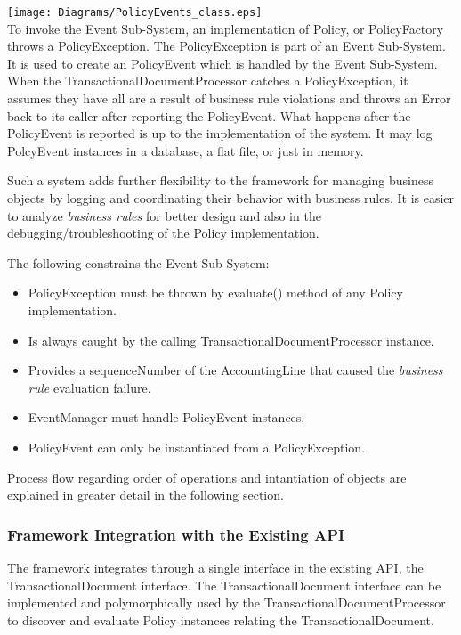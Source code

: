 \documentclass[12pt]{article}
\begin{document}
  \texttt{[image: Diagrams/PolicyEvents\_class.eps]} \\

To invoke the Event Sub-System, an implementation of \sf Policy\rm, or 
\sf PolicyFactory throws \rm a \sf PolicyException\rm. The 
\sf PolicyException \rm is
part of an Event Sub-System. It is used to create an \sf PolicyEvent \rm which
is handled by the Event Sub-System. When the \sf TransactionalDocumentProcessor 
\rm catches a \sf PolicyException\rm, it assumes they have all are a result
of business rule violations and throws an \sf Error \rm back to its caller after
reporting the \sf PolicyEvent\rm. What happens after the \sf PolicyEvent \rm is
reported is up to the implementation of the system. It may log \sf PolcyEvent
\rm instances in a database, a flat file, or just in memory.

Such a system adds further flexibility to the framework for 
managing business objects by logging and coordinating their behavior with
business rules. It is easier to analyze \emph{business rules} for better design
and also in the debugging/troubleshooting of the \sf Policy \rm implementation.

The following constrains the Event Sub-System:
\begin{itemize}
\item \sf PolicyException \rm must be thrown by \sf evaluate() \rm method of 
any \sf Policy \rm implementation.
\item Is always caught by the calling \sf TransactionalDocumentProcessor \rm
instance.
\item Provides a \sf sequenceNumber \rm of the \sf AccountingLine \rm that
caused the \emph{business rule} evaluation failure.
\item \sf EventManager \rm must handle \sf PolicyEvent \rm instances.
\item \sf PolicyEvent \rm can only be instantiated from a \sf PolicyException\rm.
\end{itemize}

  Process flow regarding order of operations and intantiation of objects are
explained in greater detail in the following section. \\

  \subsubsection{Framework Integration with the Existing API}

  The framework integrates through a single interface in the existing API, the
\sf TransactionalDocument \rm interface. The \sf TransactionalDocument \rm 
interface can be implemented and polymorphically used by the
\sf TransactionalDocumentProcessor \rm to discover and evaluate \sf Policy \rm
instances relating the \sf TransactionalDocument\rm.
\end{document}
